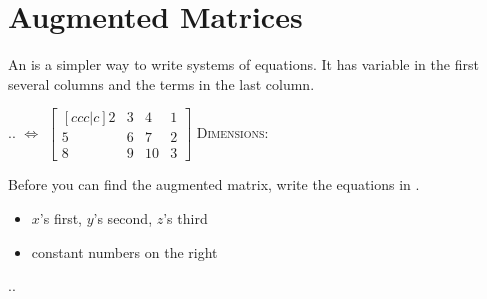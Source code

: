 \section{Augmented Matrices}

An   is a simpler way to write systems of equations.
It has variable  in the first several columns 
and the  terms in the last column.

\hfil
{
  \sysdelim..
{
  \LARGE
  $\Longleftrightarrow$
}
{
    \large
  \(
    \begin{bmatrix}[ccc|c]
      2 & 3 & 4 & 1\\
      5 & 6 & 7 & 2\\
      8 & 9 & 10 & 3
    \end{bmatrix}
  \)
}
}
{\scshape Dimensions:} 
\hfil 

\begin{tcolorbox}[center,width=6.5in]
    \large
    Before you can find the augmented matrix,
    write the equations in  .
    \begin{itemize}[nosep]
      \item $x$'s first, $y$'s second, $z$'s third 
      \item constant numbers on the right
    \end{itemize}
\end{tcolorbox}

{
    \sysdelim..
}


